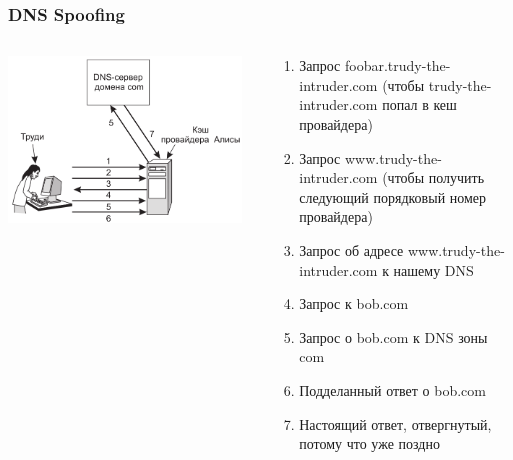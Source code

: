 \documentclass{../../slides-style}
\begin{document}
    \begin{frame}
        \frametitle{DNS Spoofing}
        \begin{columns}
            \begin{column}{0.4\textwidth}
                \includegraphics[width=0.95\textwidth]{dnsSpoofing.png}
            \end{column}
            \begin{column}{0.6\textwidth}
                \begin{footnotesize}
                    \begin{enumerate}
                        \item Запрос foobar.trudy-the-intruder.com (чтобы trudy-the-intruder.com попал в кеш провайдера)
                        \item Запрос www.trudy-the-intruder.com (чтобы получить следующий порядковый номер провайдера)
                        \item Запрос об адресе www.trudy-the-intruder.com к нашему DNS
                        \item Запрос к bob.com
                        \item Запрос о bob.com к DNS зоны com
                        \item Подделанный ответ о bob.com
                        \item Настоящий ответ, отвергнутый, потому что уже поздно
                    \end{enumerate}
                \end{footnotesize}
            \end{column}
        \end{columns}
    \end{frame}
\end{document}
